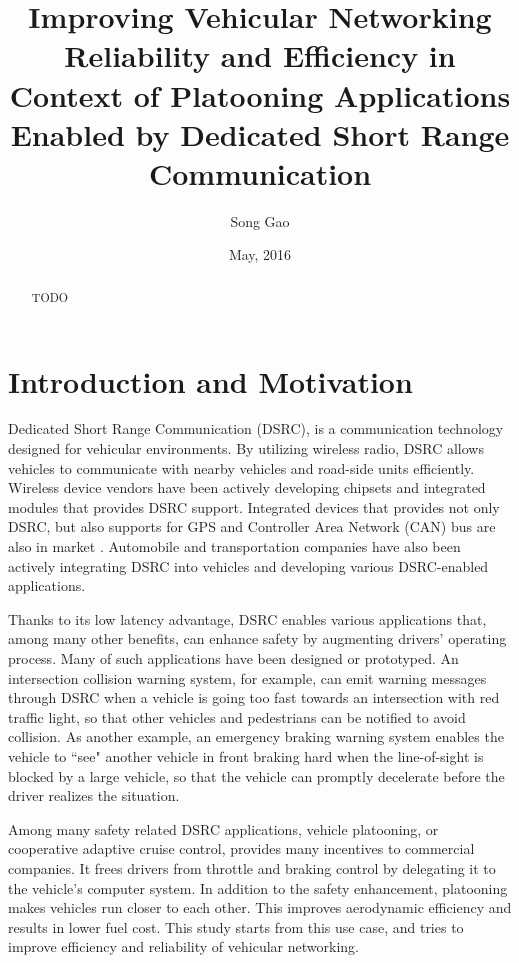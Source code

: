 \documentclass[12pt]{report}
\title{Improving Vehicular Networking Reliability and Efficiency in Context of Platooning Applications Enabled by Dedicated Short Range Communication}
\author{Song Gao}
\date{May, 2016} %
\begin{document}
\begin{romanpages}      %

\TitlePage

\begin{abstract} 
  TODO
\end{abstract}

\tableofcontents
\listoffigures
\listoftables

\printnomenclature[1.0in] %
\end{romanpages}        %


\normalem       %

\chapter{Introduction and Motivation}
Dedicated Short Range Communication (DSRC), is a communication technology designed for vehicular environments. By utilizing wireless radio, DSRC allows vehicles to communicate with nearby vehicles and road-side units efficiently. Wireless device vendors have been actively developing chipsets and integrated modules that provides DSRC support. Integrated devices that provides not only DSRC, but also supports for GPS and Controller Area Network (CAN) bus are also in market \cite{aradasystems,denso,unex}. Automobile and transportation companies have also been actively integrating DSRC into vehicles and developing various DSRC-enabled applications.

Thanks to its low latency advantage, DSRC enables various applications that, among many other benefits, can enhance safety by augmenting drivers' operating process. Many of such applications have been designed or prototyped. An intersection collision warning system, for example, can emit warning messages through DSRC when a vehicle is going too fast towards an intersection with red traffic light, so that other vehicles and pedestrians can be notified to avoid collision. As another example, an emergency braking warning system enables the vehicle to ``see" another vehicle in front braking hard when the line-of-sight is blocked by a large vehicle, so that the vehicle can promptly decelerate before the driver realizes the situation.

Among many safety related DSRC applications, vehicle platooning, or cooperative adaptive cruise control, provides many incentives to commercial companies. It frees drivers from throttle and braking control by delegating it to the vehicle's computer system. In addition to the safety enhancement, platooning makes vehicles run closer to each other. This improves aerodynamic efficiency and results in lower fuel cost. This study starts from this use case, and tries to improve efficiency and reliability of vehicular networking.
\end{document}
